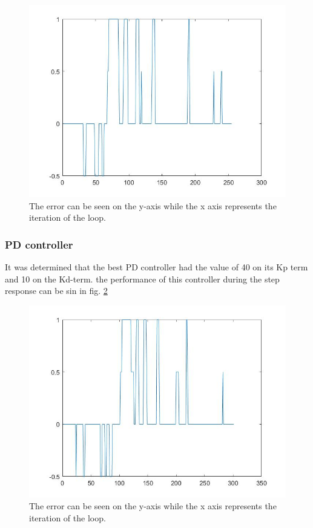 \begin{figure}[H]
    \centering
    \includegraphics[width=\textwidth]{assets/Kp40.jpg}
    \caption{The error can be seen on the y-axis while the x axis represents the iteration of the loop.}
    \label{Kp40}
\end{figure}

\subsubsection{PD controller}
It was determined that the best PD controller had the value of 40 on its Kp term and 10 on the Kd-term. the performance of this controller during the step response can be sin in fig. \ref{Kp40_10Kd}

\begin{figure}[H]
    \centering
    \includegraphics[width=\textwidth]{assets/Kp40_10Kd.jpg}
    \caption{The error can be seen on the y-axis while the x axis represents the iteration of the loop.}
    \label{Kp40_10Kd}
\end{figure}

